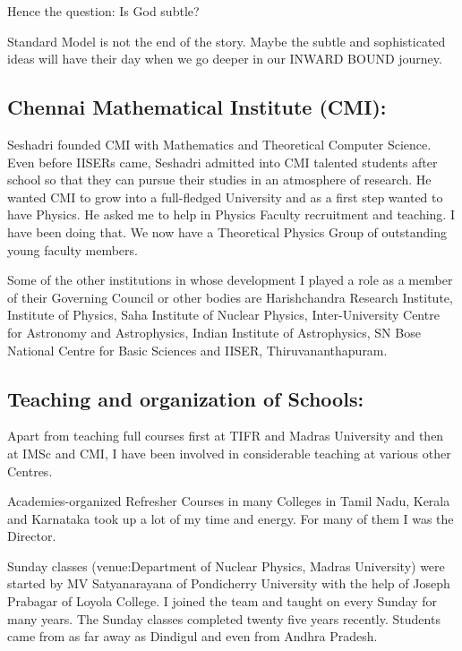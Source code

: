 Hence the question: Is God subtle?


Standard Model is not the end of the story. Maybe the subtle and 
sophisticated ideas will have their day when we go deeper in our INWARD 
BOUND journey.

\subsection*{Chennai Mathematical Institute (CMI):}

Seshadri founded CMI with Mathematics and Theoretical Computer Science. 
Even before IISERs came, Seshadri admitted into CMI talented students 
after school so that they can pursue their studies in an atmosphere of 
research. He wanted CMI to grow into a full-fledged University and as a 
first step wanted to have Physics. He asked me to help in Physics 
Faculty recruitment and teaching. I have been doing that. We now have a 
Theoretical Physics Group of outstanding young faculty members.


Some of the other institutions in whose development I pla\-yed a role as a 
member of their Governing Council or other bo\-dies are Harishchandra 
Research Institute, Institute of Physics, Saha Institute of Nuclear 
Physics, Inter-University Centre for Astro\-nomy and Astrophysics, Indian 
Institute of Astrophysics, SN Bose National Centre for Basic Sciences 
and IISER, Thiruva\-nanthapuram.
\vspace{-\topsep}
\subsection*{Teaching and organization of Schools:}

Apart from teaching full courses first at TIFR and Madras
Univer\-sity and then at IMSc and CMI, I have been involved in
conside\-rable teaching at various other Centres.


Academies-organized Refresher Courses in many Colleges in
Tamil Nadu, Kerala and Karnataka took up a lot of my time and
energy. For many of them I was the Director.


Sunday classes (venue:Department of Nuclear Physics, Mad\-ras University) 
were started by MV Satyanarayana of Pondiche\-rry University with the 
help of Joseph Prabagar of Loyola Colle\-ge. I joined the team and taught 
on every Sunday for many years. The Sunday classes completed twenty 
five years recently. Students came from as far away as Dindigul and 
even from Andhra Pradesh.


